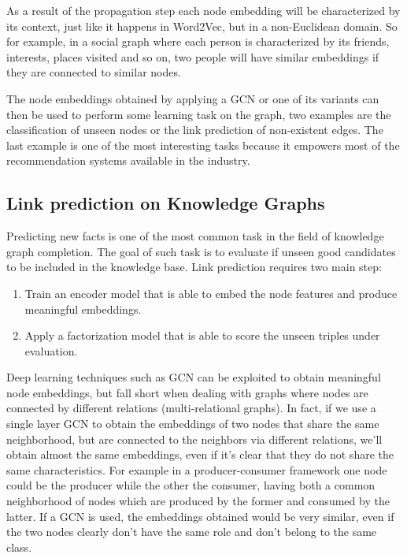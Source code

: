 \documentclass[%
    corpo=13.5pt,
    twoside,
    oldstyle,
    tipotesi=magistrale,
    greek,
    evenboxes
]{toptesi}
\begin{document}
As a result of the propagation step each node embedding will be characterized by
its context, just like it happens in Word2Vec, but in a non-Euclidean domain.
So for example, in a social graph where each person is characterized by its
friends, interests, places visited and so on, two people will have similar
embeddings if they are connected to similar nodes.

The node embeddings obtained by applying a GCN or one of its variants can
then be used to perform some learning task on the graph, two examples are
the classification of unseen nodes or the link prediction of non-existent
edges. The last example is one of the most interesting tasks because it empowers
most of the recommendation systems available in the industry.


\subsection{Link prediction on Knowledge Graphs}
\label{subsec:linkprediction}

Predicting new facts is one of the most common task in the field
of knowledge graph completion. The goal of such task is to evaluate if unseen
good candidates to be included in the knowledge base.
Link prediction requires two main step:

\begin{enumerate}
    \item Train an encoder model
    that is able to embed the node features and produce meaningful embeddings.
    \item Apply a factorization model that is able to score the unseen
    triples under evaluation.
\end{enumerate}

Deep learning techniques such as GCN can be exploited to obtain meaningful
node embeddings, but fall short when dealing with graphs where
nodes are connected by different relations (multi-relational graphs).
In fact, if we use a single layer GCN to obtain the embeddings of two nodes
that share the same neighborhood, but are connected to the neighbors via
different relations, we'll obtain almost the same embeddings, even if it's
clear that they do not share the same characteristics. For example in a
producer-consumer framework one node could be the producer while the other
the consumer, having both a common neighborhood of nodes
which are produced by the former and consumed by the latter.
If a GCN is used, the embeddings obtained would be very similar, even if
the two nodes clearly don't have the same role and don't belong to the
same class.
\end{document}
